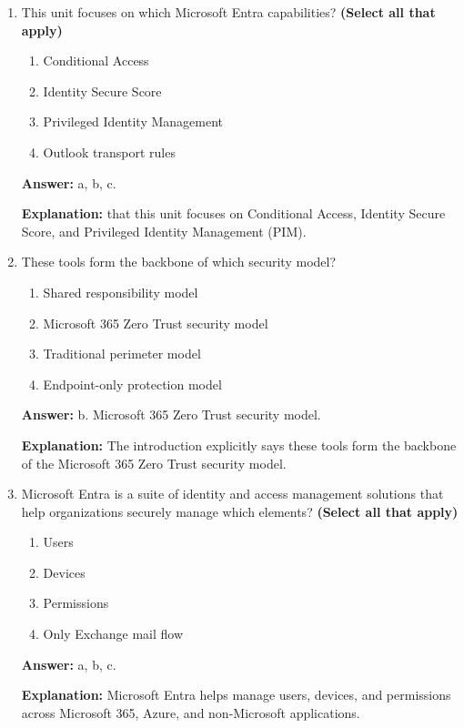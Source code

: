 \documentclass[10pt]{article}
\begin{document}
\begin{enumerate}[leftmargin=*]

\item This unit focuses on which Microsoft Entra capabilities? \textbf{(Select all that apply)}
\begin{enumerate}[label=\alph*., leftmargin=1.5em]
\item Conditional Access
\item Identity Secure Score
\item Privileged Identity Management
\item Outlook transport rules
\end{enumerate}
\textbf{Answer:} a, b, c.

\textbf{Explanation:} that this unit focuses on Conditional Access, Identity Secure Score, and Privileged Identity Management (PIM).

\item These tools form the backbone of which security model?
\begin{enumerate}[label=\alph*., leftmargin=1.5em]
\item Shared responsibility model
\item Microsoft 365 Zero Trust security model
\item Traditional perimeter model
\item Endpoint-only protection model
\end{enumerate}
\textbf{Answer:} b. Microsoft 365 Zero Trust security model.

\textbf{Explanation:} The introduction explicitly says these tools form the backbone of the Microsoft 365 Zero Trust security model.

\item Microsoft Entra is a suite of identity and access management solutions that help organizations securely manage which elements? \textbf{(Select all that apply)}
\begin{enumerate}[label=\alph*., leftmargin=1.5em]
\item Users
\item Devices
\item Permissions
\item Only Exchange mail flow
\end{enumerate}
\textbf{Answer:} a, b, c.

\textbf{Explanation:} Microsoft Entra helps manage users, devices, and permissions across Microsoft 365, Azure, and non-Microsoft applications.


\end{enumerate}
\end{document}
